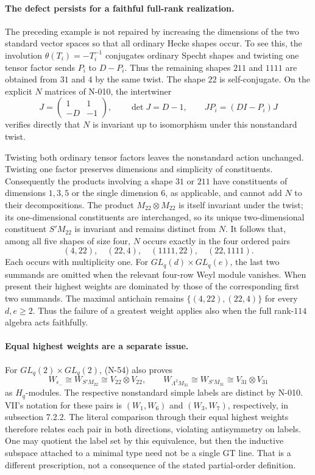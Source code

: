 \paragraph{The defect persists for a faithful full-rank realization.}
The preceding example is not repaired by increasing the
dimensions of the two standard vector spaces so that all
ordinary Hecke shapes occur.  To see this, the involution
$\theta(T_i)=-T_i^{-1}$ conjugates ordinary Specht shapes
and twisting one tensor factor sends $P_i$ to $D-P_i$.
Thus the remaining shapes $211$ and $1111$ are obtained
from $31$ and $4$ by the same twist.  The shape $22$ is
self-conjugate.  On the explicit $N$ matrices of N-010,
the intertwiner
\[
       J=\begin{pmatrix}1&1\\-D&-1\end{pmatrix},\qquad
       \det J=D-1,
       \qquad J P_i=(D I-P_i)J
 \tag{N-56}
\]
verifies directly that $N$ is invariant up to isomorphism
under this nonstandard twist.

Twisting both ordinary tensor factors leaves the nonstandard
action unchanged.  Twisting one factor preserves dimensions
and simplicity of constituents.  Consequently the products
involving a shape $31$ or $211$ have constituents of
dimensions $1,3,5$ or the single dimension $6$, as applicable,
and cannot add $N$ to their decompositions.  The product
$M_{22}\otimes M_{22}$ is itself invariant under the twist;
its one-dimensional constituents are interchanged, so its
unique two-dimensional constituent $S'M_{22}$ is invariant
and remains distinct from $N$.
It follows that, among all five shapes of size four, $N$
occurs exactly in the four ordered pairs
\[
          (4,22),\quad(22,4),\quad(1111,22),\quad(22,1111).
 \tag{N-57}
\]
Each occurs with multiplicity one.  For $GL_q(d)\times GL_q(e)$,
the last two summands are omitted when the relevant
four-row Weyl module vanishes.  When present their highest
weights are dominated by those of the corresponding first
two summands.  The maximal antichain remains
$\{(4,22),(22,4)\}$ for every $d,e\ge2$.
Thus the failure of a greatest weight applies also when
the full rank-$114$ algebra acts faithfully.

\paragraph{Equal highest weights are a separate issue.}
For $GL_q(2)\times GL_q(2)$, (N-54) also proves
\[
 W_{\epsilon_-}\cong W_{S'M_{22}}
          \cong V_{22}\otimes V_{22},\qquad
 W_{\Lambda^2M_{31}}\cong W_{S'M_{31}}
          \cong V_{31}\otimes V_{31}
 \tag{N-58}
\]
as $H_q$-modules.  The respective nonstandard simple labels
are distinct by N-010.  VII's notation for these pairs is
$(W_1,W_6)$ and $(W_3,W_7)$, respectively, in subsection 7.2.2.
The literal comparison through their equal highest weights
therefore relates each pair in both directions, violating
antisymmetry on labels.  One may quotient the label set by
this equivalence, but then the inductive subspace attached
to a minimal type need not be a single GT line.  That is a
different prescription, not a consequence of the stated
partial-order definition.

